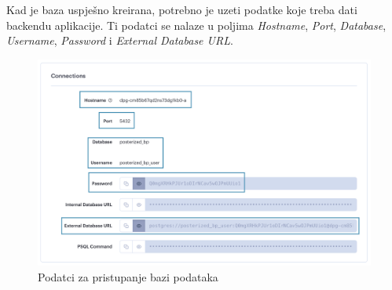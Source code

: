 			Kad je baza uspješno kreirana, potrebno je uzeti podatke koje treba dati backendu aplikacije. Ti podatci se nalaze u poljima \textit{Hostname}, \textit{Port}, \textit{Database}, \textit{Username}, \textit{Password} i \textit{External Database URL}.
			\begin{figure}[H]
				\includegraphics[scale=0.4]{slike/deploy/database4.png} %
				\centering
				\caption{Podatci za pristupanje bazi podataka}
				\label{fig:promjene}
			\end{figure}
			
